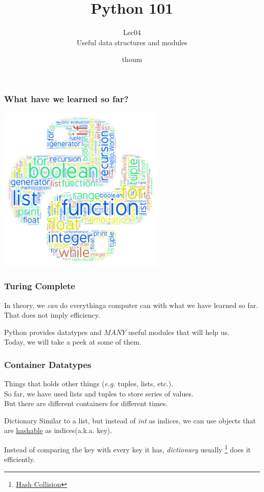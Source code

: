 \documentclass{beamer}
\title{Python 101}
\subtitle{Lec04 \\ Useful data structures and modules}
\author{thoum}
\begin{document}
\frame{\titlepage}

\begin{frame}
\frametitle{What have we learned so far?}
  \begin{center}
  \includegraphics[width=80mm]{../lec04/python_art.png}
  \end{center}
\end{frame}

\begin{frame}
\frametitle{Turing Complete}
  In theory, we \textit{can} do everything\tiny{a computer can} \normalsize with what we have learned so far.
  That does not imply efficiency.
  
\end{frame}

\begin{frame}
  Python provides datatypes and $MANY$ useful modules that will help us.\\
  Today, we will take a peek at some of them.
\end{frame}

\begin{frame}
\frametitle{Container Datatypes}
  Things that holds other things (\textit{e.g.} tuples, lists, etc.).\\
  \bigskip
  So far, we have used lists and tuples to store series of values.\\
  But there are different containers for different times.
\end{frame}

\begin{frame}{Dictionary}
  Similar to a list, but instead of \textit{int} as indices, we can use
  objects that are 
  \href{https://docs.python.org/3.7/glossary.html\#term-hashable}{hashable}
  as indices(a.k.a. key).

  Instead of comparing the key with every key it has, \textit{dictionary}
  usually
  \footnote{\href{https://en.wikipedia.org/wiki/Collision_(computer_science)}{Hash
  Collision}} does it efficiently.
\end{frame}
\end{document}
